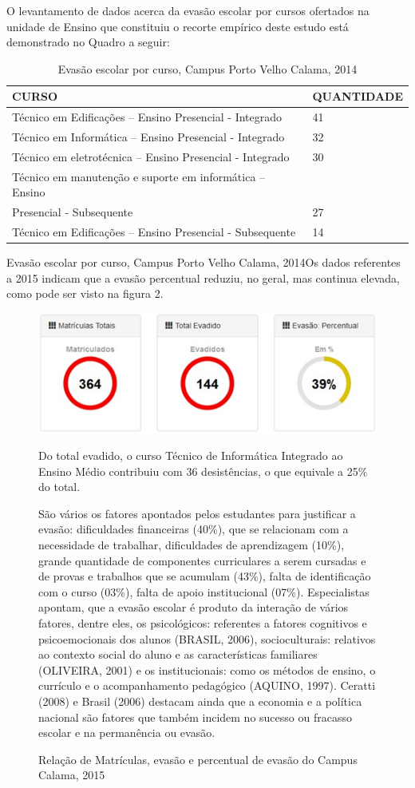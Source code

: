 \documentclass[article,12pt,onesidea,4paper,english,brazil]{abntex2}
\begin{document}
	O levantamento de dados acerca da evasão escolar por cursos ofertados na unidade de Ensino que constituiu o recorte empírico deste estudo está demonstrado no Quadro a seguir:
	\begin{table}[h]
		\centering
		\caption{Evasão escolar por curso, Campus Porto Velho Calama, 2014}
		\label{my-label}
		\begin{tabular}{ll}
			CURSO                                             & QUANTIDADE \\
			\hline
			Técnico em Edificações – Ensino Presencial - Integrado   & 41         \\
			Técnico em Informática – Ensino Presencial - Integrado   & 32         \\
			Técnico em eletrotécnica – Ensino Presencial - Integrado & 30         \\
			Técnico em manutenção e suporte em informática – Ensino  &            \\
			Presencial - Subsequente                                 & 27         \\
			Técnico em Edificações – Ensino Presencial - Subsequente & 14        
		\end{tabular}
	\end{table}

Evasão escolar por curso, Campus Porto Velho Calama, 2014Os dados referentes a 2015 indicam que a evasão percentual reduziu, no geral, mas continua elevada, como pode ser visto na figura 2.
\begin{figure}[h]
	\centering
	\includegraphics[width=0.7\linewidth]{pip-artigo09-02}
	\caption{Relação de Matrículas, evasão e percentual de evasão do Campus Calama, 2015}
	\label{fig:pip-artigo09-02}
	
	Do total evadido, o curso Técnico de Informática Integrado ao Ensino Médio contribuiu com 36 desistências, o que equivale a 25\% do total.
	
	São vários os fatores apontados pelos estudantes para justificar a evasão: dificuldades financeiras (40\%), que se relacionam com a necessidade de trabalhar, dificuldades de aprendizagem (10\%), grande quantidade de componentes curriculares a serem cursadas e de provas e trabalhos que se acumulam (43\%), falta de identificação com o curso (03\%), falta de apoio institucional (07\%). Especialistas apontam, que a evasão escolar é produto da interação de vários fatores, dentre eles, os psicológicos: referentes a fatores cognitivos e psicoemocionais dos alunos (BRASIL, 2006), socioculturais: relativos ao contexto social do aluno e as características familiares (OLIVEIRA, 2001) e os institucionais: como os métodos de ensino, o currículo e o acompanhamento pedagógico (AQUINO, 1997). Ceratti (2008) e Brasil (2006) destacam ainda que a economia e a política nacional são fatores que também incidem no sucesso ou fracasso escolar e na permanência ou evasão.
\end{figure}
\end{document}
